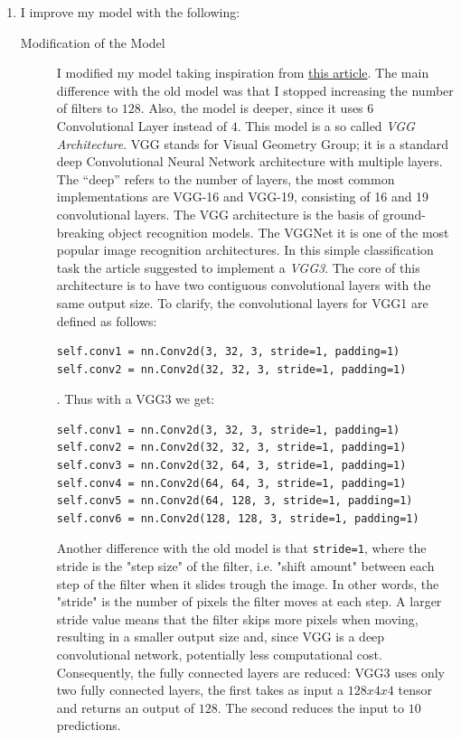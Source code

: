 \documentclass[a4paper]{article}
\begin{document}
\begin{enumerate}
       	\item  I improve my model with the following:
 \begin{description}
     \item[Modification of the Model] I modified my model taking inspiration from \href{https://machinelearningmastery.com/how-to-develop-a-cnn-from-scratch-for-cifar-10-photo-classification/}{this article}. The main difference with the old model was that I stopped increasing the number of filters to $128$. Also, the model is deeper, since it uses $6$ Convolutional Layer instead of $4$. This model is a so called \textit{VGG Architecture}. VGG stands for Visual Geometry Group; it is a standard deep Convolutional Neural Network architecture with multiple layers. The “deep” refers to the number of layers, the most common implementations are  VGG-16 and VGG-19, consisting of 16 and 19 convolutional layers. The VGG architecture is the basis of ground-breaking object recognition models. The VGGNet it is one of the most popular image recognition architectures. In this simple classification task the article suggested to implement a \textit{VGG3}. The core of this architecture is to have two contiguous convolutional layers with the same output size. To clarify, the convolutional layers for VGG1 are defined as follows:
     \begin{lstlisting}
self.conv1 = nn.Conv2d(3, 32, 3, stride=1, padding=1)
self.conv2 = nn.Conv2d(32, 32, 3, stride=1, padding=1)
     \end{lstlisting}. 
     Thus with a VGG3 we get:
      \begin{lstlisting}
self.conv1 = nn.Conv2d(3, 32, 3, stride=1, padding=1)
self.conv2 = nn.Conv2d(32, 32, 3, stride=1, padding=1)
self.conv3 = nn.Conv2d(32, 64, 3, stride=1, padding=1)
self.conv4 = nn.Conv2d(64, 64, 3, stride=1, padding=1)
self.conv5 = nn.Conv2d(64, 128, 3, stride=1, padding=1)
self.conv6 = nn.Conv2d(128, 128, 3, stride=1, padding=1)
     \end{lstlisting}
Another difference with the old model is that \texttt{stride=1}, where the stride is the "step size" of the filter, i.e. "shift amount" between each step of the filter when it slides trough the image. In other words, the "stride" is the number of pixels the filter moves at each step. A larger stride value means that the filter skips more pixels when moving, resulting in a smaller output size and, since VGG is a deep convolutional network, potentially less computational cost. Consequently, the fully connected layers are reduced: VGG3 uses only two fully connected layers, the first takes as input a $128x4x4$ tensor and returns an output of $128$. The second reduces the input to $10$ predictions.

\end{description}
\end{enumerate}
\end{document}
